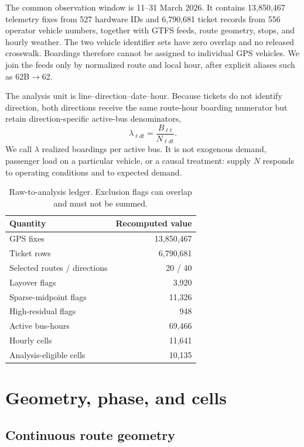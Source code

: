 \documentclass[9pt,twocolumn,twoside]{opticajnl}
\begin{document}
The common observation window is 11--31 March 2026.  It contains 13,850,467 telemetry fixes from
527 hardware IDs and 6,790,681 ticket records from 556 operator vehicle numbers, together with
GTFS feeds, route geometry, stops, and hourly weather.  The two vehicle identifier sets have zero
overlap and no released crosswalk.  Boardings therefore cannot be assigned to individual GPS
vehicles.  We join the feeds only by normalized route and local hour, after explicit aliases such
as 62B$\to$62.

The analysis unit is line--direction--date--hour.  Because tickets do not identify direction, both
directions receive the same route-hour boarding numerator but retain direction-specific active-bus
denominators,
\begin{equation}
\lambda_{\ell d t}=\frac{B_{\ell t}}{N_{\ell d t}}.
\end{equation}
We call $\lambda$ realized boardings per active bus.  It is not exogenous demand, passenger load on
a particular vehicle, or a causal treatment: supply $N$ responds to operating conditions and to
expected demand.

\begin{table}[t]
\centering
\caption{Raw-to-analysis ledger. Exclusion flags can overlap and must not be summed.}
\begin{tabular}{lr}
\toprule
Quantity & Recomputed value\\
\midrule
GPS fixes & 13,850,467\\
Ticket rows & 6,790,681\\
Selected routes / directions & 20 / 40\\
Layover flags & 3,920\\
Sparse-midpoint flags & 11,326\\
High-residual flags & 948\\
Active bus-hours & 69,466\\
Hourly cells & 11,641\\
Analysis-eligible cells & 10,135\\
\bottomrule
\end{tabular}
\label{tab:ledger}
\end{table}

\section{Geometry, phase, and cells}

\subsection{Continuous route geometry}
\end{document}
